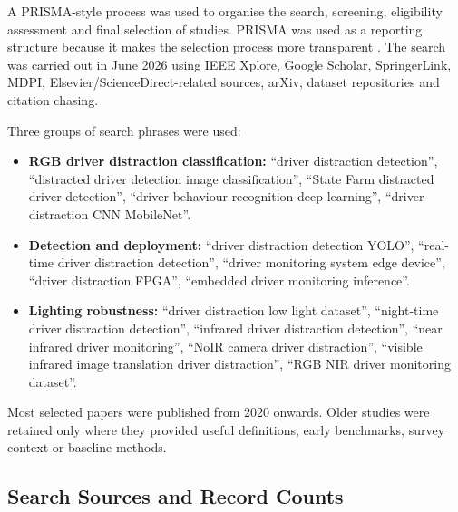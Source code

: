 \documentclass[11pt,a4paper]{article}
\let\oldsubsection\subsection
\renewcommand{\subsection}{\Needspace{6\baselineskip}\oldsubsection}
\begin{document}
A PRISMA-style process was used to organise the search, screening, eligibility assessment and final selection of studies. PRISMA was used as a reporting structure because it makes the selection process more transparent \parencite{prisma2020,page2021prisma}. The search was carried out in June 2026 using IEEE Xplore, Google Scholar, SpringerLink, MDPI, Elsevier/ScienceDirect-related sources, arXiv, dataset repositories and citation chasing.

Three groups of search phrases were used:

\begin{itemize}
    \item \textbf{RGB driver distraction classification:} ``driver distraction detection'', ``distracted driver detection image classification'', ``State Farm distracted driver detection'', ``driver behaviour recognition deep learning'', ``driver distraction CNN MobileNet''.
    \item \textbf{Detection and deployment:} ``driver distraction detection YOLO'', ``real-time driver distraction detection'', ``driver monitoring system edge device'', ``driver distraction FPGA'', ``embedded driver monitoring inference''.
    \item \textbf{Lighting robustness:} ``driver distraction low light dataset'', ``night-time driver distraction detection'', ``infrared driver distraction detection'', ``near infrared driver monitoring'', ``NoIR camera driver distraction'', ``visible infrared image translation driver distraction'', ``RGB NIR driver monitoring dataset''.
\end{itemize}

Most selected papers were published from 2020 onwards. Older studies were retained only where they provided useful definitions, early benchmarks, survey context or baseline methods.

\subsection{Search Sources and Record Counts}
\end{document}
